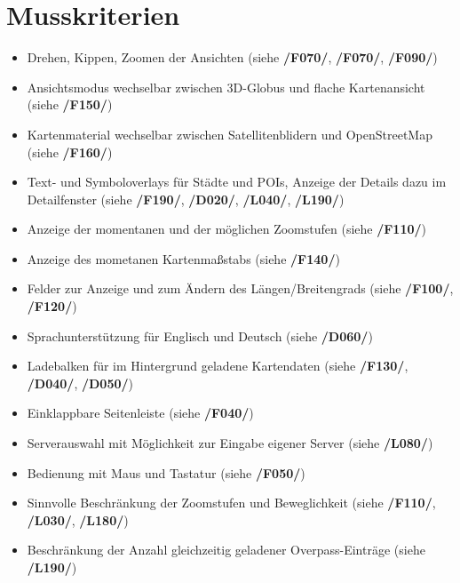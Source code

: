 \documentclass[10pt]{scrreprt}
\begin{document}
\section{Musskriterien}
\begin{itemize}
\item Drehen, Kippen, Zoomen der Ansichten (siehe \textbf{/F070/}, \textbf{/F070/}, \textbf{/F090/})
\item Ansichtsmodus wechselbar zwischen 3D-Globus und flache Kartenansicht (siehe \textbf{/F150/})
\item Kartenmaterial wechselbar zwischen Satellitenblidern und OpenStreetMap (siehe \textbf{/F160/})
\item Text- und Symboloverlays für Städte und POIs, Anzeige der Details dazu im Detailfenster (siehe \textbf{/F190/}, \textbf{/D020/}, \textbf{/L040/}, \textbf{/L190/})
\item Anzeige der momentanen und der möglichen Zoomstufen (siehe \textbf{/F110/})
\item Anzeige des mometanen Kartenmaßstabs  (siehe \textbf{/F140/})
\item Felder zur Anzeige und zum Ändern des Längen/Breitengrads (siehe \textbf{/F100/}, \textbf{/F120/})
\item Sprachunterstützung für Englisch und Deutsch (siehe \textbf{/D060/})
\item Ladebalken für im Hintergrund geladene Kartendaten (siehe \textbf{/F130/}, \textbf{/D040/}, \textbf{/D050/})
\item Einklappbare Seitenleiste (siehe \textbf{/F040/})
\item Serverauswahl mit Möglichkeit zur Eingabe eigener Server (siehe \textbf{/L080/})
\item Bedienung mit Maus und Tastatur (siehe \textbf{/F050/})
\item Sinnvolle Beschränkung der Zoomstufen und Beweglichkeit (siehe \textbf{/F110/}, \textbf{/L030/}, \textbf{/L180/})
\item Beschränkung der Anzahl gleichzeitig geladener Overpass-Einträge (siehe \textbf{/L190/})
\end{itemize}
\end{document}
